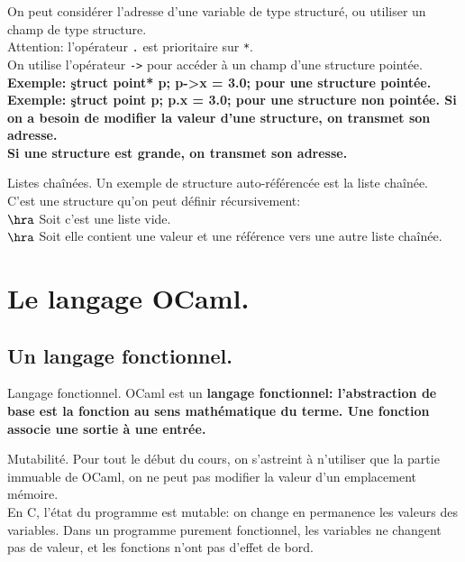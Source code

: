 \documentclass[french, 11pt]{article}
\begin{document}
\begin{defi}{}{}
    On peut considérer l'adresse d'une variable de type structuré, ou utiliser un champ de type structure.\\
    Attention: l'opérateur \texttt{.} est prioritaire sur \texttt{*}.\\
    On utilise l'opérateur \texttt{->} pour accéder à un champ d'une structure pointée.\n
    \bf{Exemple:} \c{struct point* p; p->x = 3.0;} pour une structure pointée.\\
    \bf{Exemple:} \c{struct point p; p.x = 3.0;} pour une structure non pointée.\n
    Si on a besoin de modifier la valeur d'une structure, on transmet son adresse.\\
    Si une structure est grande, on transmet son adresse.
\end{defi}

\begin{ex}{Listes chaînées.}{}
    Un exemple de structure auto-référencée est la liste chaînée.\\
    C'est une structure qu'on peut définir récursivement:\\
    $\hra$ Soit c'est une liste vide.\\
    $\hra$ Soit elle contient une valeur et une référence vers une autre liste chaînée.
\end{ex}

\section{Le langage OCaml.}

\subsection{Un langage fonctionnel.}

\begin{defi}{Langage fonctionnel.}{}
    OCaml est un \bf{langage fonctionnel}: l'abstraction de base est la fonction au sens mathématique du terme. Une fonction associe une sortie à une entrée.
\end{defi}

\begin{defi}{Mutabilité.}{}
    Pour tout le début du cours, on s'astreint à n'utiliser que la partie immuable de OCaml, on ne peut pas modifier la valeur d'un emplacement mémoire.\\
    En C, l'état du programme est mutable: on change en permanence les valeurs des variables.\n
    Dans un programme purement fonctionnel, les variables ne changent pas de valeur, et les fonctions n'ont pas d'effet de bord.
\end{defi}
\end{document}
